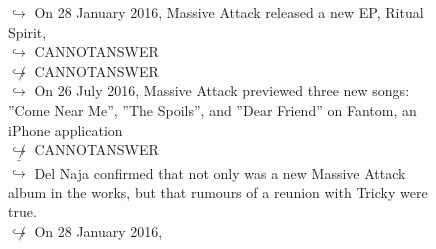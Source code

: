 \documentclass[11pt,a4paper, onecolumn]{article}
\begin{document}
\begin{figure}[t] \small \begin{tcolorbox}[boxsep=0pt,left=5pt,right=0pt,top=2pt,colback = yellow!5] \begin{dialogue}
 \small 
\colorbox{pink!25}{$\hookrightarrow$}
{ On 28 January 2016, Massive Attack released a new EP, Ritual Spirit, }
\\
\colorbox{pink!25}{$\hookrightarrow$}
{ CANNOTANSWER }
\\
\colorbox{pink!25}{$\not\hookrightarrow$}
{ CANNOTANSWER }
\\
\colorbox{pink!25}{$\hookrightarrow$}
{ On 26 July 2016, Massive Attack previewed three new songs: ''Come Near Me'', ''The Spoils'', and ''Dear Friend'' on Fantom, an iPhone application }
\\
\colorbox{pink!25}{$\not\hookrightarrow$}
{ CANNOTANSWER }
\\
\colorbox{pink!25}{ $\bar{\hookrightarrow}$}
{ Del Naja confirmed that not only was a new Massive Attack album in the works, but that rumours of a reunion with Tricky were true. }
\\
\colorbox{pink!25}{$\not\hookrightarrow$}
{ On 28 January 2016, }
\\
 \end{dialogue}\end{tcolorbox}\end{figure}
\end{document}
